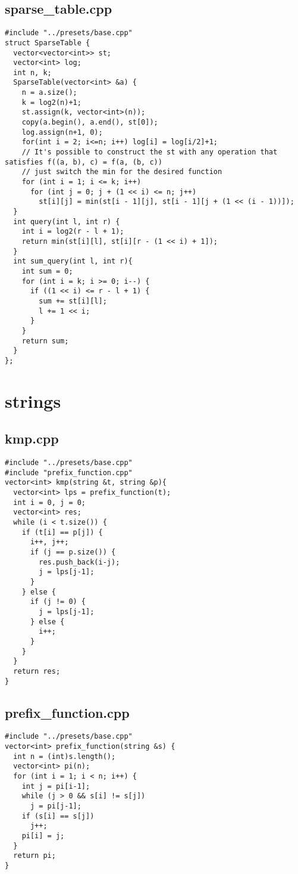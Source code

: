 \documentclass[11pt,landscape,twocolumn]{article}
\begin{document}
\subsection*{sparse\_table.cpp}
\begin{lstlisting}
#include "../presets/base.cpp"
struct SparseTable {
  vector<vector<int>> st;
  vector<int> log;
  int n, k;
  SparseTable(vector<int> &a) {
    n = a.size();
    k = log2(n)+1;
    st.assign(k, vector<int>(n));
    copy(a.begin(), a.end(), st[0]);
    log.assign(n+1, 0);
    for(int i = 2; i<=n; i++) log[i] = log[i/2]+1;
    // It's possible to construct the st with any operation that satisfies f((a, b), c) = f(a, (b, c))
    // just switch the min for the desired function
    for (int i = 1; i <= k; i++)
      for (int j = 0; j + (1 << i) <= n; j++)
        st[i][j] = min(st[i - 1][j], st[i - 1][j + (1 << (i - 1))]);
  }
  int query(int l, int r) {
    int i = log2(r - l + 1);
    return min(st[i][l], st[i][r - (1 << i) + 1]);
  }
  int sum_query(int l, int r){
    int sum = 0;
    for (int i = k; i >= 0; i--) {
      if ((1 << i) <= r - l + 1) {
        sum += st[i][l];
        l += 1 << i;
      }
    }
    return sum;
  }
};
\end{lstlisting}

\section{strings}
\subsection*{kmp.cpp}
\begin{lstlisting}
#include "../presets/base.cpp"
#include "prefix_function.cpp"
vector<int> kmp(string &t, string &p){
  vector<int> lps = prefix_function(t);
  int i = 0, j = 0;
  vector<int> res;
  while (i < t.size()) {
    if (t[i] == p[j]) {
      i++, j++;
      if (j == p.size()) {
        res.push_back(i-j);
        j = lps[j-1];
      }
    } else {
      if (j != 0) {
        j = lps[j-1];
      } else {
        i++;
      }
    }
  }
  return res;
}
\end{lstlisting}

\subsection*{prefix\_function.cpp}
\begin{lstlisting}
#include "../presets/base.cpp"
vector<int> prefix_function(string &s) {
  int n = (int)s.length();
  vector<int> pi(n);
  for (int i = 1; i < n; i++) {
    int j = pi[i-1];
    while (j > 0 && s[i] != s[j])
      j = pi[j-1];
    if (s[i] == s[j])
      j++;
    pi[i] = j;
  }
  return pi;
}
\end{lstlisting}
\end{document}
